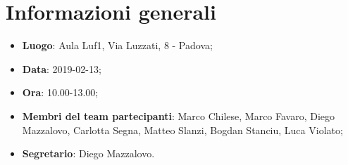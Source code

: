 \section{Informazioni generali}

\begin{itemize}
	\item \textbf{Luogo}: Aula Luf1, Via Luzzati, 8 - Padova; 
	\item \textbf{Data}: 2019-02-13; 
	\item \textbf{Ora}: 10.00-13.00; 
	\item \textbf{Membri del team partecipanti}: Marco Chilese, Marco Favaro, Diego Mazzalovo, Carlotta Segna, Matteo Slanzi, Bogdan Stanciu, Luca Violato; 
	\item \textbf{Segretario}: Diego Mazzalovo. 
\end{itemize}